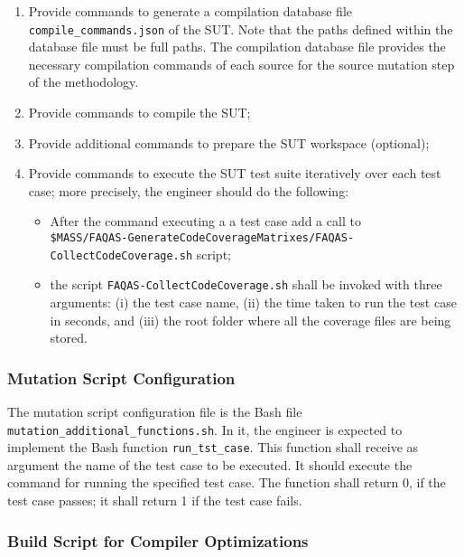 \begin{enumerate}
	\item Provide commands to generate a compilation database file \texttt{compile\_commands.json} of the SUT. Note that the paths defined within the database file must be full paths. The compilation database file provides the necessary compilation commands of each source for the source mutation step of the methodology.
	\item Provide commands to compile the SUT;
	\item Provide additional commands to prepare the SUT workspace (optional);
	\item Provide commands to execute the SUT test suite iteratively over each test case; more precisely, the engineer should do the following:
	\begin{itemize}
		\item After the command executing a a test case add a call to \\\texttt{\$MASS/FAQAS-GenerateCodeCoverageMatrixes/FAQAS-CollectCodeCoverage.sh} script;
		\item the script \texttt{FAQAS-CollectCodeCoverage.sh} shall be invoked with three arguments: (i) the test case name, (ii) the time taken to run the test case in seconds, and (iii) the root folder where all the coverage files are being stored.
	\end{itemize}
\end{enumerate}

\subsubsection{Mutation Script Configuration}

The mutation script configuration file is the Bash file \texttt{mutation\_additional\_functions.sh}. In it, the engineer is expected to implement the Bash function \texttt{run\_tst\_case}.
This function shall receive as argument the name of the test case to be executed. It should execute the command for running the specified test case. 
The function shall return 0, if the test case passes; it shall return 1 if the test case fails.


\subsubsection{Build Script for Compiler Optimizations}

